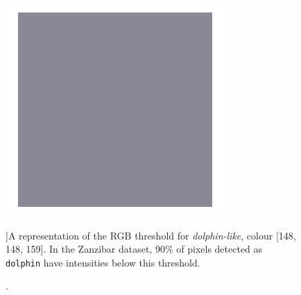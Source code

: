 \begin{figure}
	\begin{center}
		\includegraphics[scale=0.3]{Chapter3/figs/148-148-159.png}
	\end{center}
	\caption[A representation of the RGB threshold for \textit{dolphin-like}, colour [148, 148, 159].]{A representation of the RGB threshold for \textit{dolphin-like}, colour [148, 148, 159]. In the Zanzibar dataset, 90\% of pixels detected as \texttt{dolphin} have intensities below this threshold.}\label{fig:colour-threshold}
\end{figure}

